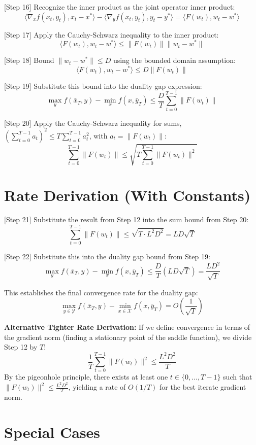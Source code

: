 \documentclass{article}
\begin{document}
[Step 16] Recognize the inner product as the joint operator inner product:
$$ \langle \nabla_x f(x_t, y_t), x_t - x^* \rangle - \langle \nabla_y f(x_t, y_t), y_t - y^* \rangle = \langle F(w_t), w_t - w^* \rangle $$

[Step 17] Apply the Cauchy-Schwarz inequality to the inner product:
$$ \langle F(w_t), w_t - w^* \rangle \leq \|F(w_t)\| \|w_t - w^*\| $$

[Step 18] Bound $\|w_t - w^*\| \leq D$ using the bounded domain assumption:
$$ \langle F(w_t), w_t - w^* \rangle \leq D \|F(w_t)\| $$

[Step 19] Substitute this bound into the duality gap expression:
$$ \max_{y} f(\bar{x}_T, y) - \min_{x} f(x, \bar{y}_T) \leq \frac{D}{T} \sum_{t=0}^{T-1} \|F(w_t)\| $$

[Step 20] Apply the Cauchy-Schwarz inequality for sums, $\left(\sum_{t=0}^{T-1} a_t\right)^2 \leq T \sum_{t=0}^{T-1} a_t^2$, with $a_t = \|F(w_t)\|$:
$$ \sum_{t=0}^{T-1} \|F(w_t)\| \leq \sqrt{T \sum_{t=0}^{T-1} \|F(w_t)\|^2} $$

\section*{Rate Derivation (With Constants)}

[Step 21] Substitute the result from Step 12 into the sum bound from Step 20:
$$ \sum_{t=0}^{T-1} \|F(w_t)\| \leq \sqrt{T \cdot L^2 D^2} = L D \sqrt{T} $$

[Step 22] Substitute this into the duality gap bound from Step 19:
$$ \max_{y} f(\bar{x}_T, y) - \min_{x} f(x, \bar{y}_T) \leq \frac{D}{T} \left( L D \sqrt{T} \right) = \frac{L D^2}{\sqrt{T}} $$

This establishes the final convergence rate for the duality gap:
$$ \max_{y \in \mathcal{Y}} f(\bar{x}_T, y) - \min_{x \in \mathcal{X}} f(x, \bar{y}_T) = O\left(\frac{1}{\sqrt{T}}\right) $$

\textbf{Alternative Tighter Rate Derivation:}
If we define convergence in terms of the gradient norm (finding a stationary point of the saddle function), we divide Step 12 by $T$:
$$ \frac{1}{T} \sum_{t=0}^{T-1} \|F(w_t)\|^2 \leq \frac{L^2 D^2}{T} $$
By the pigeonhole principle, there exists at least one $t \in \{0, \dots, T-1\}$ such that $\|F(w_t)\|^2 \leq \frac{L^2 D^2}{T}$, yielding a rate of $O(1/T)$ for the best iterate gradient norm.

\section*{Special Cases}
\end{document}
